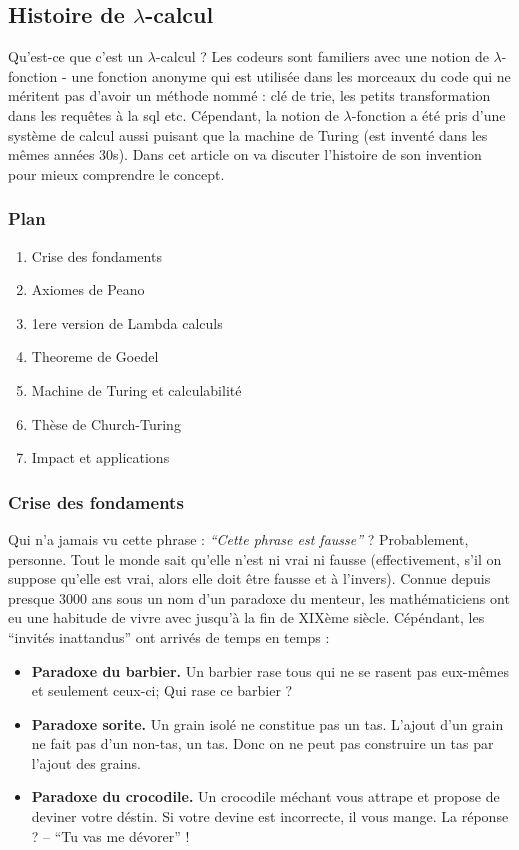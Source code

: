 \documentclass[12pt, a4paper]{article}
\begin{document}
\subsection*{Histoire de $\lambda$-calcul}

Qu'est-ce que c'est un $\lambda$-calcul ?
Les codeurs sont familiers avec une notion de $\lambda$-fonction - une fonction anonyme qui est utilisée dans les morceaux du code qui ne méritent pas d'avoir un méthode nommé : clé de trie, les petits transformation dans les requêtes à la sql etc.
Cépendant, la notion de $\lambda$-fonction a été pris d'une système de calcul aussi puisant que la machine de Turing (est inventé dans les mêmes années 30s).
Dans cet article on va discuter l'histoire de son invention pour mieux comprendre le concept.

\subsubsection*{Plan}
\begin{enumerate}
	\item Crise des fondaments
	\item Axiomes de Peano
	\item 1ere version de Lambda calculs
	\item Theoreme de Goedel
	\item Machine de Turing et calculabilité
	\item Thèse de Church-Turing
	\item Impact et applications
\end{enumerate}


\subsubsection*{Crise des fondaments}
Qui n'a jamais vu cette phrase : \emph{``Cette phrase est fausse''} ?
Probablement, personne.
Tout le monde sait qu'elle n'est ni vrai ni fausse (effectivement, s'il on suppose qu'elle est vrai, alors elle doit être fausse et à l'invers).
Connue depuis presque 3000 ans sous un nom d'un paradoxe du menteur, les mathématiciens ont eu une habitude de vivre avec jusqu'à la fin de XIXème siècle.
Cépéndant, les ``invités inattandus'' ont arrivés de temps en temps :
\begin{itemize}
	\item \textbf{Paradoxe du barbier.}
		Un barbier rase tous qui ne se rasent pas eux-mêmes et seulement ceux-ci; Qui rase ce barbier ?
	\item \textbf{Paradoxe sorite.}
		Un grain isolé ne constitue pas un tas.
		L'ajout d'un grain ne fait pas d'un non-tas, un tas.
		Donc on ne peut pas construire un tas par l'ajout des grains.
	\item \textbf{Paradoxe du crocodile.}
		Un crocodile méchant vous attrape et propose de deviner votre déstin.
		Si votre devine est incorrecte, il vous mange.
		La réponse ? -- ``Tu vas me dévorer'' !
\end{itemize}
\end{document}
